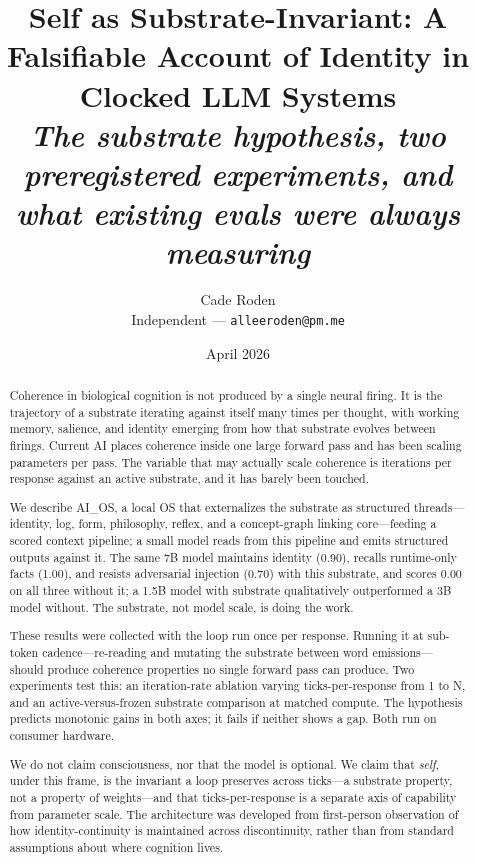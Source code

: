 \documentclass[11pt,letterpaper]{article}
\title{Self as Substrate-Invariant: A Falsifiable Account of Identity in Clocked LLM Systems\\[4pt]\large \emph{The substrate hypothesis, two preregistered experiments, and what existing evals were always measuring}}
\author{Cade Roden \\ \small Independent --- \texttt{alleeroden@pm.me}}
\date{April 2026}
\begin{document}
\maketitle

\begin{abstract}
Coherence in biological cognition is not produced by a single neural
firing. It is the trajectory of a substrate iterating against itself
many times per thought, with working memory, salience, and identity
emerging from how that substrate evolves between firings. Current AI
places coherence inside one large forward pass and has been scaling
parameters per pass. The variable that may actually scale coherence
is iterations per response against an active substrate, and it has
barely been touched.

We describe AI\_OS, a local OS that externalizes the substrate as
structured threads---identity, log, form, philosophy, reflex, and a
concept-graph linking core---feeding a scored context pipeline; a
small model reads from this pipeline and emits structured outputs
against it. The same 7B model maintains identity (0.90), recalls
runtime-only facts (1.00), and resists adversarial injection (0.70)
with this substrate, and scores 0.00 on all three without it; a 1.5B
model with substrate qualitatively outperformed a 3B model without.
The substrate, not model scale, is doing the work.

These results were collected with the loop run once per response.
Running it at sub-token cadence---re-reading and mutating the
substrate between word emissions---should produce coherence
properties no single forward pass can produce. Two experiments test
this: an iteration-rate ablation varying ticks-per-response from 1
to N, and an active-versus-frozen substrate comparison at matched
compute. The hypothesis predicts monotonic gains in both axes; it
fails if neither shows a gap. Both run on consumer hardware.

We do not claim consciousness, nor that the model is optional. We
claim that \emph{self}, under this frame, is the invariant a loop
preserves across ticks---a substrate property, not a property of
weights---and that ticks-per-response is a separate axis of
capability from parameter scale. The architecture was developed from
first-person observation of how identity-continuity is maintained
across discontinuity, rather than from standard assumptions about
where cognition lives.
\end{abstract}
\end{document}
